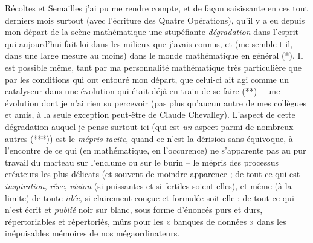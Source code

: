 \documentclass[11pt,a4paper]{article}
\begin{document}

Récoltes et Semailles j'ai pu me rendre compte, et de façon saisissante en ces tout derniers mois surtout (avec l'écriture des Quatre Opérations), qu'il y a eu depuis mon départ de la scène mathématique une stupéfiante \emph{dégradation} dans l'esprit qui aujourd'hui fait loi dans les milieux que j'avais connus, et (me semble-t-il, dans une large mesure au moins) dans le monde mathématique en général (*). Il est possible même, \struck{\ill{}} tant par ma personnalité mathématique très particulière que par les conditions qui ont entouré mon départ, que celui-ci ait agi comme un catalyseur dans une évolution qui était déjà en train de se faire (**) -- une évolution dont je n'ai  rien su percevoir (pas plus qu'aucun autre de mes collègues et amis, à la seule exception peut-être de Claude Chevalley).
L'aspect de cette dégradation auquel je pense surtout ici (qui  est  \emph{un} aspect parmi de nombreux autres (***)) est le \emph{mépris tacite}, quand ce n'est la dérision sans équivoque, à l'encontre de ce qui (en mathématique, en l'occurence) ne s'apparente pas au pur travail du marteau sur l'enclume ou sur le burin -- le mépris des processus créateurs les plus délicats (et  souvent de moindre apparence\add{)} ; de tout ce qui est  \emph{inspiration}, \emph{rêve}, \emph{vision} (si puissantes et si fertiles soient-elles), et même (à la limite) de toute \emph{idée}, si clairement conçue et formulée soit-elle : de tout ce qui n'est écrit et \emph{publié} noir sur blanc, sous forme d'énoncés purs et durs, répertoriables et répertoriés, mûrs pour les « banques de données »  dans les inépuisables mémoires de nos mégaordinateurs.
\end{document}
